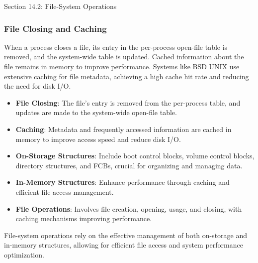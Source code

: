 \begin{notes}{Section 14.2: File-System Operations}
\begin{highlight}
    \end{highlight}
    
    \subsubsection*{File Closing and Caching}
    
    When a process closes a file, its entry in the per-process open-file table is removed, and the system-wide table is updated. Cached information about the file remains in memory to improve performance. Systems like BSD UNIX use extensive caching for file metadata, achieving a high cache hit rate and reducing the need for disk I/O.
    
    \begin{highlight}
    
        \begin{itemize}
            \item \textbf{File Closing}: The file's entry is removed from the per-process table, and updates are made to the system-wide open-file table.
            \item \textbf{Caching}: Metadata and frequently accessed information are cached in memory to improve access speed and reduce disk I/O.
        \end{itemize}
    
    \end{highlight}
    
    \begin{highlight}
    
        \begin{itemize}
            \item \textbf{On-Storage Structures}: Include boot control blocks, volume control blocks, directory structures, and FCBs, crucial for organizing and managing data.
            \item \textbf{In-Memory Structures}: Enhance performance through caching and efficient file access management.
            \item \textbf{File Operations}: Involves file creation, opening, usage, and closing, with caching mechanisms improving performance.
        \end{itemize}
    
    File-system operations rely on the effective management of both on-storage and in-memory structures, allowing for efficient file access and system performance optimization.
    
    \end{highlight}
\end{notes}

